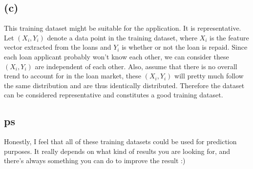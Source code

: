 \documentclass[11pt]{article}
\begin{document}
\subsection{(c)}
This training dataset might be suitable for the application. It is representative. \\
Let $(X_i, Y_i)$ denote a data point in the training dataset, where $X_i$ is the feature vector extracted from the loans and $Y_i$ is whether or not the loan is repaid. Since each loan applicant probably won't know each other, we can consider these $(X_i, Y_i)$ are independent of each other. Also, assume that there is no overall trend to account for in the loan market, these $(X_i, Y_i)$ will pretty much follow the same distribution and are thus identically distributed. Therefore the dataset can be considered representative and constitutes a good training dataset.

\subsection{ps}
Honestly, I feel that all of these training datasets could be used for prediction purposes. It really depends on what kind of results you are looking for, and there's always something you can do to improve the result :)
\end{document}
